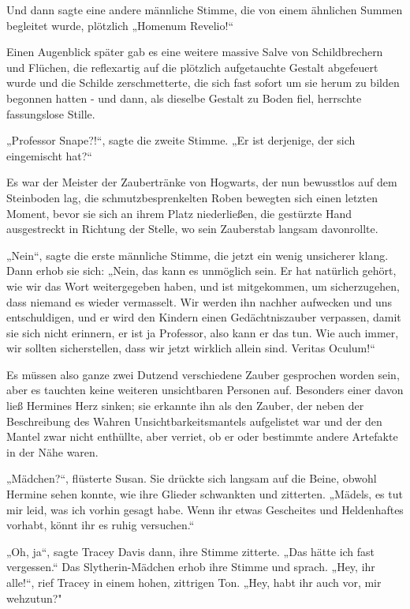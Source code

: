 {Und dann sagte eine andere männliche Stimme, die von einem ähnlichen Summen begleitet wurde, plötzlich „Homenum Revelio!“

Einen Augenblick später gab es eine weitere massive Salve von Schildbrechern und Flüchen, die reflexartig auf die plötzlich aufgetauchte Gestalt abgefeuert wurde und die Schilde zerschmetterte, die sich fast sofort um sie herum zu bilden begonnen hatten - und dann, als dieselbe Gestalt zu Boden fiel, herrschte fassungslose Stille.

„Professor Snape?!“, sagte die zweite Stimme. „Er ist derjenige, der sich eingemischt hat?“

Es war der Meister der Zaubertränke von Hogwarts, der nun bewusstlos auf dem Steinboden lag, die schmutzbesprenkelten Roben bewegten sich einen letzten Moment, bevor sie sich an ihrem Platz niederließen, die gestürzte Hand ausgestreckt in Richtung der Stelle, wo sein Zauberstab langsam davonrollte.

„Nein“, sagte die erste männliche Stimme, die jetzt ein wenig unsicherer klang. Dann erhob sie sich: „Nein, das kann es unmöglich sein. Er hat natürlich gehört, wie wir das Wort weitergegeben haben, und ist mitgekommen, um sicherzugehen, dass niemand es wieder vermasselt. Wir werden ihn nachher aufwecken und uns entschuldigen, und er wird den Kindern einen Gedächtniszauber verpassen, damit sie sich nicht erinnern, er ist ja Professor, also kann er das tun. Wie auch immer, wir sollten sicherstellen, dass wir jetzt wirklich allein sind. Veritas Oculum!“

Es müssen also ganze zwei Dutzend verschiedene Zauber gesprochen worden sein, aber es tauchten keine weiteren unsichtbaren Personen auf. Besonders einer davon ließ Hermines Herz sinken; sie erkannte ihn als den Zauber, der neben der Beschreibung des Wahren Unsichtbarkeitsmantels aufgelistet war und der den Mantel zwar nicht enthüllte, aber verriet, ob er oder bestimmte andere Artefakte in der Nähe waren.

„Mädchen?“, flüsterte Susan. Sie drückte sich langsam auf die Beine, obwohl Hermine sehen konnte, wie ihre Glieder schwankten und zitterten. „Mädels, es tut mir leid, was ich vorhin gesagt habe. Wenn ihr etwas Gescheites und Heldenhaftes vorhabt, könnt ihr es ruhig versuchen.“

„Oh, ja“, sagte Tracey Davis dann, ihre Stimme zitterte. „Das hätte ich fast vergessen.“ Das Slytherin-Mädchen erhob ihre Stimme und sprach. „Hey, ihr alle!“, rief Tracey in einem hohen, zittrigen Ton. „Hey, habt ihr auch vor, mir wehzutun?"

}
